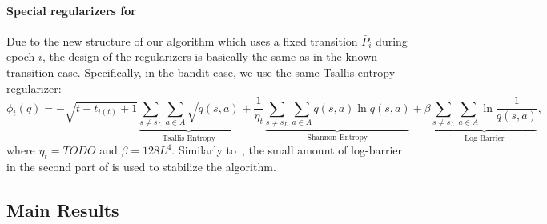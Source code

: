 \paragraph{Special regularizers for \ftrl}
Due to the new structure of our algorithm which uses a fixed transition $\bar{P}_i$ during epoch $i$, the design of the regularizers is basically the same as in the known transition case.
Specifically, in the bandit case, we use the same Tsallis entropy regularizer: {\color{magenta}
\begin{equation}\label{eq:Tsallis}
\phi_t(q) =  -\sqrt{t - t_{i(t)}+1}\underbrace{\sum_{s \neq s_L} \sum_{a\in A} \sqrt{ q(s,a) } }_{ \text{Tsallis Entropy}  } + \frac{1}{\eta_t} \underbrace{\sum_{s\neq s_L} \sum_{a\in A} q(s,a)\ln q(s,a) }_{ \text{Shannon Entropy}  } + \beta  \underbrace{\sum_{s\neq s_L} \sum_{a\in A} \ln \frac{1}{q(s,a)}}_{ \text{Log Barrier}  },
\end{equation}
where $\eta_t = TODO $ and $\beta = 128L^4$.}
Similarly to~\citep{jin2020simultaneously}, the small amount of log-barrier in the second part of  is used to stabilize the algorithm.


\subsection{Main Results}\label{sec:results}

\begin{theorem}\label{thm:main_delayed}
\end{theorem} 



